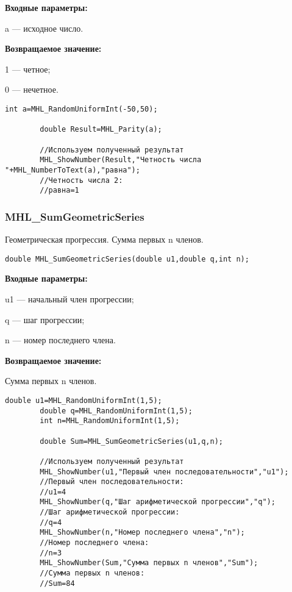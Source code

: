 \documentclass[a4paper,12pt]{article}
\begin{document}
\textbf{Входные параметры:}  
 
a --- исходное число.

\textbf{Возвращаемое значение:}

 1 --- четное;
 
 0 --- нечетное.


\begin{lstlisting}[label=code_use_MHL_Parity,caption=Пример использования]
        int a=MHL_RandomUniformInt(-50,50);

        double Result=MHL_Parity(a);

        //Используем полученный результат
        MHL_ShowNumber(Result,"Четность числа "+MHL_NumberToText(a),"равна");
        //Четность числа 2:
        //равна=1
\end{lstlisting}

\subsubsection{MHL\_SumGeometricSeries}\label{MHL_SumGeometricSeries}

Геометрическая прогрессия. Сумма первых n членов.


\begin{lstlisting}[label=code_syntax_MHL_SumGeometricSeries,caption=Синтаксис]
double MHL_SumGeometricSeries(double u1,double q,int n);
\end{lstlisting}

\textbf{Входные параметры:}  
 
u1 --- начальный член прогрессии;
 
q --- шаг  прогрессии;
 
n --- номер последнего члена.

\textbf{Возвращаемое значение:}
 
Сумма первых n членов.


\begin{lstlisting}[label=code_use_MHL_SumGeometricSeries,caption=Пример использования]
        double u1=MHL_RandomUniformInt(1,5);
        double q=MHL_RandomUniformInt(1,5);
        int n=MHL_RandomUniformInt(1,5);

        double Sum=MHL_SumGeometricSeries(u1,q,n);

        //Используем полученный результат
        MHL_ShowNumber(u1,"Первый член последовательности","u1");
        //Первый член последовательности:
        //u1=4
        MHL_ShowNumber(q,"Шаг арифметической прогрессии","q");
        //Шаг арифметической прогрессии:
        //q=4
        MHL_ShowNumber(n,"Номер последнего члена","n");
        //Номер последнего члена:
        //n=3
        MHL_ShowNumber(Sum,"Сумма первых n членов","Sum");
        //Сумма первых n членов:
        //Sum=84
\end{lstlisting}
\end{document}
